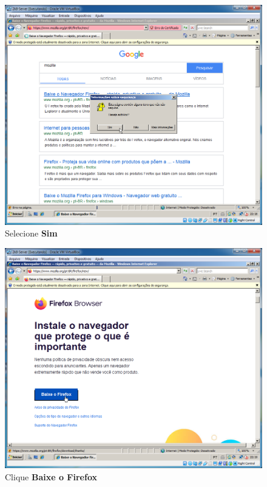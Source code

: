 \documentclass[10pt]{article}
\begin{document}
\begin{figure}[H]
    \centering
    \caption{Selecione \textbf{Sim}}
    \label{fig:re048}
    \includegraphics[width=\linewidth]{images/rede_externa/re048.png}
\end{figure}
\begin{figure}[H]
    \centering
    \caption{Clique \textbf{Baixe o Firefox}}
    \label{fig:re049}
    \includegraphics[width=\linewidth]{images/rede_externa/re049.png}
\end{figure}
\end{document}
